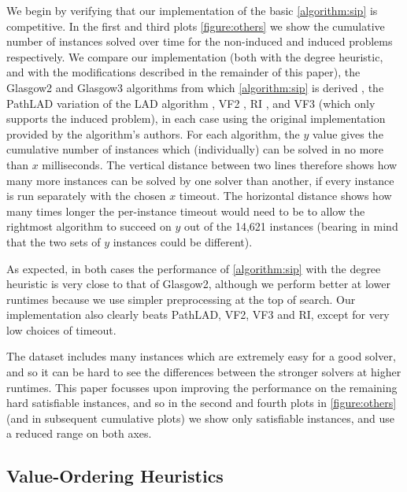 \documentclass[letterpaper]{article} %
\begin{document}
We begin by verifying that our implementation of the basic \cref{algorithm:sip} is competitive. In
the first and third plots \cref{figure:others} we show the cumulative number of instances solved
over time for the non-induced and induced problems respectively. We compare our implementation (both
with the degree heuristic, and with the modifications described in the remainder of this paper), the
Glasgow2 and Glasgow3 algorithms from which \cref{algorithm:sip} is derived
\cite{DBLP:conf/cp/McCreeshP15,DBLP:conf/lion/KotthoffMS16}, the PathLAD variation of the LAD
algorithm \cite{DBLP:journals/ai/Solnon10,DBLP:conf/lion/KotthoffMS16}, VF2
\cite{DBLP:journals/pami/CordellaFSV04}, RI \cite{DBLP:journals/bmcbi/BonniciGPSF13}, and VF3
\cite{DBLP:conf/gbrpr/CarlettiFSV17} (which only supports the induced problem), in each case using
the original implementation provided by the algorithm's authors. For each algorithm, the $y$ value
gives the cumulative number of instances which (individually) can be solved in no more than $x$
milliseconds.  The vertical distance between two lines therefore shows how many more instances can
be solved by one solver than another, if every instance is run separately with the chosen $x$
timeout. The horizontal distance shows how many times longer the per-instance timeout would need to
be to allow the rightmost algorithm to succeed on $y$ out of the 14,621 instances (bearing in mind
that the two sets of $y$ instances could be different).

As expected, in both cases the performance of \cref{algorithm:sip} with the degree heuristic is very
close to that of Glasgow2, although we perform better at lower runtimes because we use simpler
preprocessing at the top of search. Our implementation also clearly beats PathLAD, VF2, VF3 and RI,
except for very low choices of timeout.

The dataset includes many instances which are extremely easy for a good solver, and so it can be
hard to see the differences between the stronger solvers at higher runtimes. This paper focusses
upon improving the performance on the remaining hard satisfiable instances, and so in the second and
fourth plots in \cref{figure:others} (and in subsequent cumulative plots) we show only satisfiable
instances, and use a reduced range on both axes.

\subsection{Value-Ordering Heuristics}
\end{document}
